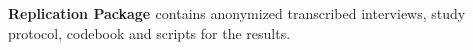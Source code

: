 \documentclass[sigconf,review,anonymous, table]{acmart}
\def\bf{\textbf}
\newcommand{\nd}{\vspace{1mm}\noindent}
\begin{document}
\nd\bf{Replication Package \cite{website:replication-package}} contains anonymized transcribed interviews, study protocol, codebook and scripts for the results.

















\begin{acks}
\end{acks}




%
\end{document}
